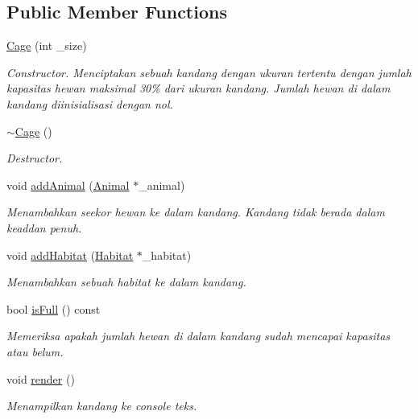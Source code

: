 \subsection*{Public Member Functions}
\begin{DoxyCompactItemize}
\item 
\hyperlink{classCage_a9010aec97e645b7a5374ef02129b7dc3}{Cage} (int \+\_\+size)
\begin{DoxyCompactList}\small\item\em Constructor. Menciptakan sebuah kandang dengan ukuran tertentu dengan jumlah kapasitas hewan maksimal 30\% dari ukuran kandang. Jumlah hewan di dalam kandang diinisialisasi dengan nol. \end{DoxyCompactList}\item 
\hypertarget{classCage_a657259499dfc23c63fc65aeaf8abbb17}{\hyperlink{classCage_a657259499dfc23c63fc65aeaf8abbb17}{$\sim$\+Cage} ()}\label{classCage_a657259499dfc23c63fc65aeaf8abbb17}

\begin{DoxyCompactList}\small\item\em Destructor. \end{DoxyCompactList}\item 
void \hyperlink{classCage_a3315b5b1e578b9a57bd52b7bd84851eb}{add\+Animal} (\hyperlink{classAnimal}{Animal} $\ast$\+\_\+animal)
\begin{DoxyCompactList}\small\item\em Menambahkan seekor hewan ke dalam kandang. Kandang tidak berada dalam keaddan penuh. \end{DoxyCompactList}\item 
void \hyperlink{classCage_adc760f475c13edb5e4f34606ca211e6a}{add\+Habitat} (\hyperlink{classHabitat}{Habitat} $\ast$\+\_\+habitat)
\begin{DoxyCompactList}\small\item\em Menambahkan sebuah habitat ke dalam kandang. \end{DoxyCompactList}\item 
bool \hyperlink{classCage_a6e4f2417918ef61eee36cdf27a807a8d}{is\+Full} () const 
\begin{DoxyCompactList}\small\item\em Memeriksa apakah jumlah hewan di dalam kandang sudah mencapai kapasitas atau belum. \end{DoxyCompactList}\item 
\hypertarget{classCage_a42eda8d1a0f6b5105a0c5dfc75cebe70}{void \hyperlink{classCage_a42eda8d1a0f6b5105a0c5dfc75cebe70}{render} ()}\label{classCage_a42eda8d1a0f6b5105a0c5dfc75cebe70}

\begin{DoxyCompactList}\small\item\em Menampilkan kandang ke console teks. \end{DoxyCompactList}\end{DoxyCompactItemize}


